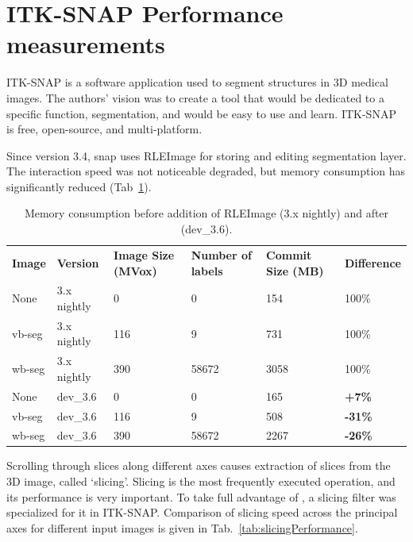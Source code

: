 \documentclass{InsightArticle}
\begin{document}
\section{ITK-SNAP Performance measurements}

ITK-SNAP is a software application used to segment structures in 3D medical images.
The authors' vision was to create a tool that would be dedicated to a specific function,
segmentation, and would be easy to use and learn.
ITK-SNAP is free, open-source, and multi-platform.

Since version 3.4, snap uses RLEImage for storing and editing segmentation layer.
The interaction speed was not noticeable degraded,
but memory consumption has significantly reduced (Tab~\ref{tab:memoryConsumption}).

\begin{table}[h]
	\centering
		\begin{tabular}{llllll}
		\textbf{Image} & \textbf{Version} & \textbf{Image Size (MVox)} & \textbf{Number of labels} & \textbf{Commit Size (MB)} & \textbf{Difference}            \\
		None           & 3.x nightly      & 0                          & 0                         & 154                       & 100\%                          \\
		vb-seg         & 3.x nightly      & 116                        & 9                         & 731                       & 100\%                          \\
		wb-seg         & 3.x nightly      & 390                        & 58672                     & 3058                      & 100\%                          \\
		None           & dev\_3.6         & 0                          & 0                         & 165                       & {\color{red} \textbf{+7\%}}    \\
		vb-seg         & dev\_3.6         & 116                        & 9                         & 508                       & {\color{green} \textbf{-31\%}} \\
		wb-seg         & dev\_3.6         & 390                        & 58672                     & 2267                      & {\color{green} \textbf{-26\%}}
		\end{tabular}
	\caption{Memory consumption before addition of RLEImage (3.x nightly) and after (dev\_3.6).}
	\label{tab:memoryConsumption}
\end{table}

Scrolling through slices along different axes causes
extraction of slices from the 3D image, called `slicing'.
Slicing is the most frequently executed operation, and its performance is very important.
To take full advantage of ,
a slicing filter was specialized for it in ITK-SNAP.
Comparison of slicing speed across the principal axes for different input images
is given in Tab.~\ref{tab:slicingPerformance}.
\end{document}
